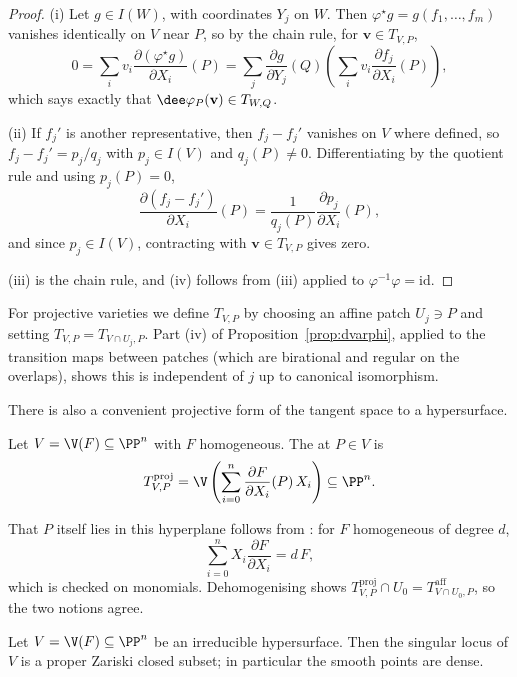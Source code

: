 \begin{proof}
	(i) Let $g \in I(W)$, with coordinates $Y_j$ on $W$. Then $\varphi^\star g = g(f_1,\dots,f_m)$ vanishes identically on $V$ near $P$, so by the chain rule, for $\mathbf v \in T_{V,P}$,
	$$0 = \sum_i v_i \frac{\partial (\varphi^\star g)}{\partial X_i}(P) = \sum_j \frac{\partial g}{\partial Y_j}(Q)\left(\sum_i v_i \frac{\partial f_j}{\partial X_i}(P)\right),$$
	which says exactly that $\dee\varphi_P(\mathbf v) \in T_{W,Q}$.

	(ii) If $f_j'$ is another representative, then $f_j - f_j'$ vanishes on $V$ where defined, so $f_j - f_j' = p_j/q_j$ with $p_j \in I(V)$ and $q_j(P) \neq 0$. Differentiating by the quotient rule and using $p_j(P) = 0$,
	$$\frac{\partial (f_j - f_j')}{\partial X_i}(P) = \frac{1}{q_j(P)}\frac{\partial p_j}{\partial X_i}(P),$$
	and since $p_j \in I(V)$, contracting with $\mathbf v \in T_{V,P}$ gives zero.

	(iii) is the chain rule, and (iv) follows from (iii) applied to $\varphi^{-1}\varphi = \mathrm{id}$.
\end{proof}

For projective varieties we define $T_{V,P}$ by choosing an affine patch $U_j \ni P$ and setting $T_{V,P} = T_{V\cap U_j, P}$. Part (iv) of Proposition~\ref{prop:dvarphi}, applied to the transition maps between patches (which are birational and regular on the overlaps), shows this is independent of $j$ up to canonical isomorphism.

There is also a convenient projective form of the tangent space to a hypersurface.

\begin{definition}
	Let $V = \V(F) \subseteq \PP^n$ with $F$ homogeneous. The  at $P \in V$ is
	$$T^{\mathrm{proj}}_{V,P} = \V\left(\sum_{i=0}^n \frac{\partial F}{\partial X_i}(P)\,X_i\right) \subseteq \PP^n.$$
\end{definition}

That $P$ itself lies in this hyperplane follows from : for $F$ homogeneous of degree $d$,
$$\sum_{i=0}^n X_i\frac{\partial F}{\partial X_i} = d\,F,$$
which is checked on monomials. Dehomogenising shows $T^{\mathrm{proj}}_{V,P} \cap U_0 = T^{\mathrm{aff}}_{V\cap U_0, P}$, so the two notions agree.

\begin{proposition}\label{prop:singclosed}
	Let $V = \V(F) \subseteq \PP^n$ be an irreducible hypersurface. Then the singular locus of $V$ is a proper Zariski closed subset; in particular the smooth points are dense.
\end{proposition}

